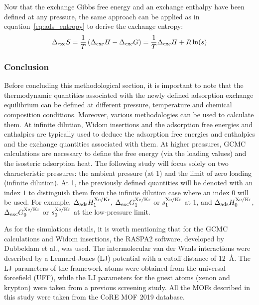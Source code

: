 \documentclass[main.tex]{subfiles}
\begin{document}
Now that the exchange Gibbs free energy and an exchange enthalpy have been defined at any pressure, the same approach can be applied as in equation~\ref{eq:ads_entropy} to derive the exchange entropy:
\begin{equation}\label{eq:exc_entropy}
  \Delta_{\text{exc}}S = \dfrac{1}{T}\left(\Delta_{\text{exc}}H - \Delta_{\text{exc}}G\right)= \dfrac{1}{T}\Delta_{\text{exc}}H + R\ln(s)
\end{equation}

\subsubsection{Conclusion}

Before concluding this methodological section, it is important to note that the thermodynamic quantities associated with the newly defined adsorption exchange equilibrium can be defined at different pressure, temperature and chemical composition conditions. Moreover, various methodologies can be used to calculate them. At infinite dilution, Widom insertions and the adsorption free energies and enthalpies are typically used to deduce the adsorption free energies and enthalpies and the exchange quantities associated with them. At higher pressures, GCMC calculations are necessary to define the free energy (via the loading values) and the isosteric adsorption heat. The following study will focus solely on two characteristic pressures: the ambient pressure (at \SI{1}{\atm}) and the limit of zero loading (infinite dilution). At \SI{1}{\atm}, the previously defined quantities will be denoted with an index $1$ to distinguish them from the infinite dilution case where an index $0$ will be used. For example, $\Delta_{\text{ads}}H_{\text{1}}^{\text{Xe/Kr}}$, $\Delta_{\text{exc}}G_{\text{1}}^{\text{Xe/Kr}}$ or $s_{\text{1}}^{\text{Xe/Kr}}$ at \SI{1}{\atm}, and $\Delta_{\text{ads}}H_{\text{0}}^{\text{Xe/Kr}}$, $\Delta_{\text{exc}}G_{\text{0}}^{\text{Xe/Kr}}$ or $s_{\text{0}}^{\text{Xe/Kr}}$ at the low-pressure limit. 

As for the simulations details, it is worth mentioning that for the GCMC calculations and Widom insertions, the RASPA2 software, developed by Dubbeldam et al.\autocite{dubbeldam2016}, was used. The intermolecular van der Waals interactions were described by a Lennard-Jones (LJ) potential with a cutoff distance of \SI{12}{\angstrom}. The LJ parameters of the framework atoms were obtained from the universal forcefield (UFF),\autocite{rappe1992} while the LJ parameters for the guest atoms (xenon and krypton) were taken from a previous screening study.\autocite{Ryan_2010} All the MOFs described in this study were taken from the CoRE MOF 2019 database.\autocite{Chung_2019}
\end{document}

